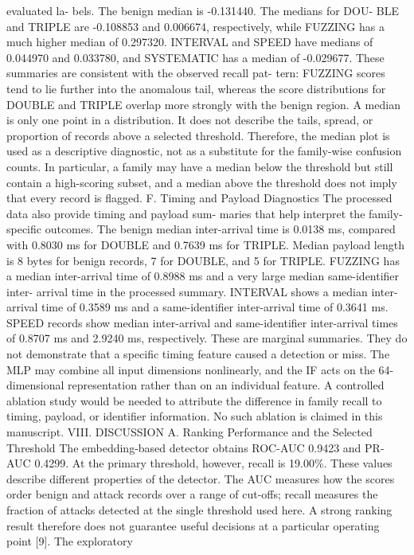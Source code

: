 \documentclass[
]{article}
\begin{document}
evaluated la- bels. The benign median is -0.131440. The medians for DOU-
BLE and TRIPLE are -0.108853 and 0.006674, respectively, while FUZZING
has a much higher median of 0.297320. INTERVAL and SPEED have medians of
0.044970 and 0.033780, and SYSTEMATIC has a median of -0.029677. These
summaries are consistent with the observed recall pat- tern: FUZZING
scores tend to lie further into the anomalous tail, whereas the score
distributions for DOUBLE and TRIPLE overlap more strongly with the
benign region. A median is only one point in a distribution. It does not
describe the tails, spread, or proportion of records above a selected
threshold. Therefore, the median plot is used as a descriptive
diagnostic, not as a substitute for the family-wise confusion counts. In
particular, a family may have a median below the threshold but still
contain a high-scoring subset, and a median above the threshold does not
imply that every record is flagged. F. Timing and Payload Diagnostics
The processed data also provide timing and payload sum- maries that help
interpret the family-specific outcomes. The benign median inter-arrival
time is 0.0138 ms, compared with 0.8030 ms for DOUBLE and 0.7639 ms for
TRIPLE. Median payload length is 8 bytes for benign records, 7 for
DOUBLE, and 5 for TRIPLE. FUZZING has a median inter-arrival time of
0.8988 ms and a very large median same-identifier inter- arrival time in
the processed summary. INTERVAL shows a median inter-arrival time of
0.3589 ms and a same-identifier inter-arrival time of 0.3641 ms. SPEED
records show median inter-arrival and same-identifier inter-arrival
times of 0.8707 ms and 2.9240 ms, respectively. These are marginal
summaries. They do not demonstrate that a specific timing feature caused
a detection or miss. The MLP may combine all input dimensions
nonlinearly, and the IF acts on the 64-dimensional representation rather
than on an individual feature. A controlled ablation study would be
needed to attribute the difference in family recall to timing, payload,
or identifier information. No such ablation is claimed in this
manuscript. VIII. DISCUSSION A. Ranking Performance and the Selected
Threshold The embedding-based detector obtains ROC-AUC 0.9423 and PR-AUC
0.4299. At the primary threshold, however, recall is 19.00\%. These
values describe different properties of the detector. The AUC measures
how the scores order benign and attack records over a range of cut-offs;
recall measures the fraction of attacks detected at the single threshold
used here. A strong ranking result therefore does not guarantee useful
decisions at a particular operating point {[}9{]}. The exploratory
\end{document}
